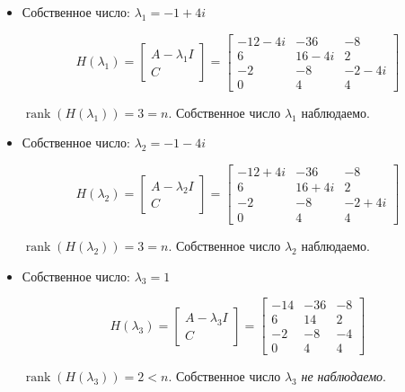 \documentclass[a4paper,12pt]{article}
\begin{document}
	\begin{itemize}
		
		\item Собственное число: $\lambda_1 = -1 + 4i$
		
		\[
		H(\lambda_1) =
		\begin{bmatrix}
			A - \lambda_1 I \\
			C
		\end{bmatrix}
		=
		\begin{bmatrix}
			-12-4i & -36 & -8 \\
			6 & 16-4i & 2 \\
			-2 & -8 & -2-4i \\
			0 & 4 & 4
		\end{bmatrix}
		\]
		
		$\operatorname{rank}(H(\lambda_1)) = 3 = n$. Собственное число $\lambda_1$ наблюдаемо.
		
		\item Собственное число: $\lambda_2 = -1 - 4i$
		
		\[
		H(\lambda_2) =
		\begin{bmatrix}
			A - \lambda_2 I \\
			C
		\end{bmatrix}
		=
		\begin{bmatrix}
			-12+4i & -36 & -8 \\
			6 & 16+4i & 2 \\
			-2 & -8 & -2+4i \\
			0 & 4 & 4
		\end{bmatrix}
		\]
		
		$\operatorname{rank}(H(\lambda_2)) = 3 = n$. Собственное число $\lambda_2$ наблюдаемо.
		
		\item Собственное число: $\lambda_3 = 1$
		
		\[
		H(\lambda_3) =
		\begin{bmatrix}
			A - \lambda_3 I \\
			C
		\end{bmatrix}
		=
		\begin{bmatrix}
			-14 & -36 & -8 \\
			6 & 14 & 2 \\
			-2 & -8 & -4 \\
			0 & 4 & 4
		\end{bmatrix}
		\]
		
		$\operatorname{rank}(H(\lambda_3)) = 2 < n$. Собственное число $\lambda_3$ \textit{не наблюдаемо}.
		
	\end{itemize}
	
\end{document}
